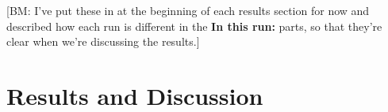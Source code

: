 \documentclass{ruthesis}
\begin{document}
[BM: I've put these in at the beginning of each results section for now and described how each run is different in the \textbf{In this run:} parts, so that they're clear when we're discussing the results.]



\FloatBarrier

\section{Results and Discussion}



%
%
%
\end{document}
